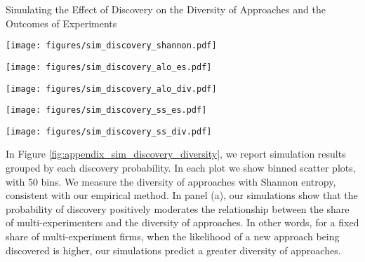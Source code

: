 \begin{lightfigure}[h!]
    \caption{Simulating the Effect of Discovery on the Diversity of Approaches and the Outcomes of Experiments}
    \label{fig:appendix_sim_discovery_diversity}
    \centering
    \begin{sublightfigure}[t]{.3\textwidth}
        \centering
        \caption{}
        \texttt{[image: figures/sim\_discovery\_shannon.pdf]}
        \label{subfig:target_diversity_rob1}
    \end{sublightfigure}
    \begin{sublightfigure}[t]{.3\textwidth}
        \centering
        \caption{}
        \texttt{[image: figures/sim\_discovery\_alo\_es.pdf]}
        \label{subfig:target_diversity_rob1}
    \end{sublightfigure}
    \begin{sublightfigure}[t]{.3\textwidth}
        \centering
        \caption{}
        \texttt{[image: figures/sim\_discovery\_alo\_div.pdf]}
        \label{subfig:target_diversity_rob1}
    \end{sublightfigure}
    \begin{sublightfigure}[t]{.3\textwidth}
        \centering
        \caption{}
        \texttt{[image: figures/sim\_discovery\_ss\_es.pdf]}
        \label{subfig:target_diversity_rob1}
    \end{sublightfigure}
    \begin{sublightfigure}[t]{.3\textwidth}
        \centering
        \caption{}
        \texttt{[image: figures/sim\_discovery\_ss\_div.pdf]}
        \label{subfig:target_diversity_rob1}
    \end{sublightfigure}
\end{lightfigure}



In Figure \ref{fig:appendix_sim_discovery_diversity}, we report simulation results grouped by each discovery probability. In each plot we show binned scatter plots, with 50 bins. We measure the diversity of approaches with Shannon entropy, consistent with our empirical method. In panel (a), our simulations show that the probability of discovery positively moderates the relationship between the share of multi-experimenters and the diversity of approaches. In other words, for a fixed share of multi-experiment firms, when the likelihood of a new approach being discovered is higher, our simulations predict a greater diversity of approaches.

